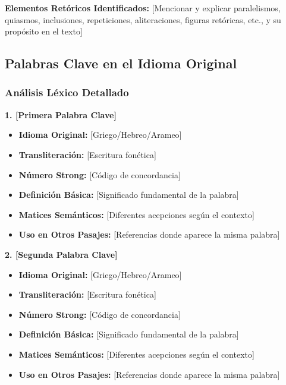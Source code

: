 \documentclass[12pt,a4paper]{article}
\newcommand{\palabraclave}[1]{\textcolor{ambergold}{\textbf{#1}}}
\begin{document}
\begin{mdframed}[style=AlertBox]
\textbf{Elementos Retóricos Identificados:}
[Mencionar y explicar paralelismos, quiasmos, inclusiones, repeticiones, aliteraciones, figuras retóricas, etc., y su propósito en el texto]
\end{mdframed}

\subsection{Palabras Clave en el Idioma Original}

\subsubsection{Análisis Léxico Detallado}

\textbf{1. \palabraclave{[Primera Palabra Clave]}}
\begin{itemize}[leftmargin=*]
    \item \textbf{Idioma Original:} [Griego/Hebreo/Arameo]
    \item \textbf{Transliteración:} [Escritura fonética]
    \item \textbf{Número Strong:} [Código de concordancia]
    \item \textbf{Definición Básica:} [Significado fundamental de la palabra]
    \item \textbf{Matices Semánticos:} [Diferentes acepciones según el contexto]
    \item \textbf{Uso en Otros Pasajes:} [Referencias donde aparece la misma palabra]
\end{itemize}

\textbf{2. \palabraclave{[Segunda Palabra Clave]}}
\begin{itemize}[leftmargin=*]
    \item \textbf{Idioma Original:} [Griego/Hebreo/Arameo]
    \item \textbf{Transliteración:} [Escritura fonética]
    \item \textbf{Número Strong:} [Código de concordancia]
    \item \textbf{Definición Básica:} [Significado fundamental de la palabra]
    \item \textbf{Matices Semánticos:} [Diferentes acepciones según el contexto]
    \item \textbf{Uso en Otros Pasajes:} [Referencias donde aparece la misma palabra]
\end{itemize}
\end{document}
